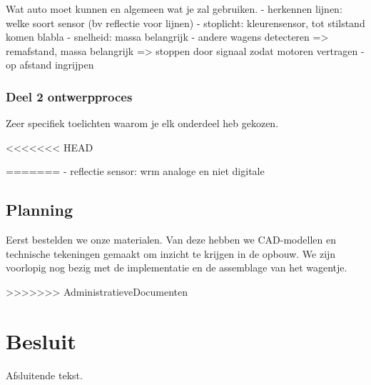 \documentclass[a4paper,twoside,kulak]{kulakreport} %
\begin{document}
Wat auto moet kunnen en algemeen wat je zal gebruiken.
- herkennen lijnen: welke soort sensor (bv reflectie voor lijnen)
- stoplicht: kleurensensor, tot stilstand komen blabla
- snelheid: massa belangrijk
- andere wagens detecteren => remafstand, massa belangrijk => stoppen door signaal zodat motoren vertragen
- op afstand ingrijpen \cite{ChassisW79:online}

\subsection{Deel 2 ontwerpproces}
Zeer specifiek toelichten waarom je elk onderdeel heb gekozen.

<<<<<<< HEAD



=======
- reflectie sensor: wrm analoge en niet digitale
\section{Planning}
Eerst bestelden we onze materialen. Van deze hebben we CAD-modellen en technische tekeningen gemaakt om inzicht te krijgen in de opbouw. We zijn voorlopig nog bezig met de implementatie en de assemblage van het wagentje.





>>>>>>> AdministratieveDocumenten
\chapter*{Besluit}
Afsluitende tekst.




\end{document}
